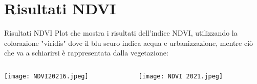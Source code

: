 \documentclass{beamer} %
\begin{document}
\section{Risultati NDVI}

        \begin{frame}{Risultati NDVI}
Plot che mostra i risultati dell'indice NDVI, utilizzando la colorazione "viridis" dove il blu scuro indica acqua e urbanizzazione, mentre ciò che va a schiarirsi è rappresentata dalla vegetazione:
\bigskip
\begin{columns}
    \begin{column}{0.6\textwidth}
    \begin{center}
        \texttt{[image: NDVI20216.jpeg]}
        \caption{NDVI 2016}
        \end{center}
\end{column}
\begin{column}{0.6\textwidth}
\begin{center}
\texttt{[image: NDVI 2021.jpeg]}
\caption{NDVI 2021}
\end{center}
\end{column}
\end{columns}
     \end{frame}
\end{document}
